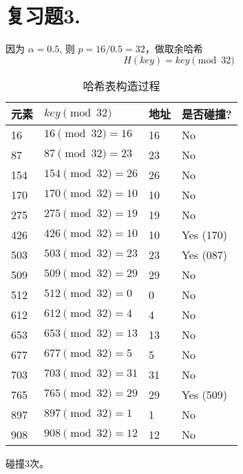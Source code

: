\documentclass{ctexart}
\begin{document}
\section*{复习题3.}
因为 $\alpha=0.5$, 则 $p=16/0.5=32$，做取余哈希
\[ H(key) = key \pmod{32} \]
\begin{table}[h!]
\centering
\begin{tabular}{@{}llll@{}}
\toprule
元素 & $key \pmod{32}$ & 地址 & 是否碰撞? \\ \midrule
16   & $16 \pmod{32}=16$   & 16   & No        \\ %
87   & $87 \pmod{32} = 23$  & 23   & No        \\
154  & $154 \pmod{32} = 26$ & 26   & No        \\
170  & $170 \pmod{32} = 10$ & 10   & No        \\
275  & $275 \pmod{32} = 19$ & 19   & No        \\
426  & $426 \pmod{32} = 10$ & 10   & Yes (170) \\
503  & $503 \pmod{32} = 23$ & 23   & Yes (087) \\
509  & $509 \pmod{32} = 29$ & 29   & No        \\
512  & $512 \pmod{32} = 0$  & 0    & No        \\
612  & $612 \pmod{32} = 4$  & 4    & No        \\
653  & $653 \pmod{32} = 13$ & 13   & No        \\
677  & $677 \pmod{32} = 5$  & 5    & No        \\
703  & $703 \pmod{32} = 31$ & 31   & No        \\
765  & $765 \pmod{32} = 29$ & 29   & Yes (509) \\
897  & $897 \pmod{32} = 1$  & 1    & No        \\
908  & $908 \pmod{32} = 12$ & 12   & No        \\ \bottomrule
\end{tabular}
\caption{哈希表构造过程}
\end{table}
碰撞3次。
\end{document}
